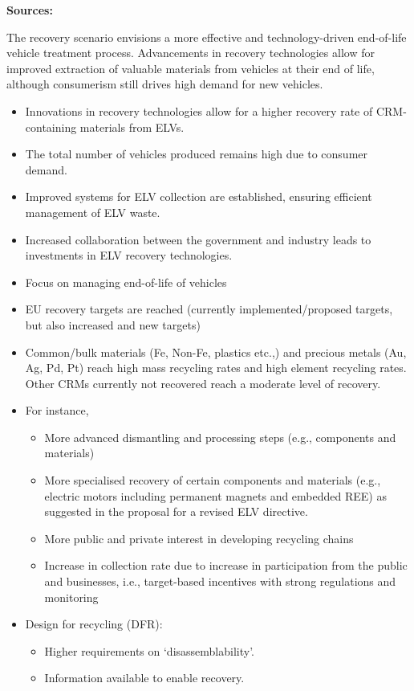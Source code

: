 \wasteSubsubsecELV 
\textbf{Sources:}~\cite{eu2023elv,lovik2021elv, tazi2023elv,helander2023battelv,ljunggren2022elv, iea2023evoutlook}

The recovery scenario envisions a more effective and technology-driven end-of-life vehicle treatment process. Advancements in recovery technologies allow for improved extraction of valuable materials from vehicles at their end of life, although consumerism still drives high demand for new vehicles.

\begin{itemize}
  \item Innovations in recovery technologies allow for a higher recovery rate of CRM-containing materials from ELVs.
  \item The total number of vehicles produced remains high due to consumer demand.
  \item Improved systems for ELV collection are established, ensuring efficient management of ELV waste.
  \item Increased collaboration between the government and industry leads to investments in ELV recovery technologies.
  \item Focus on managing end-of-life of vehicles
  \item EU recovery targets are reached (currently implemented/proposed targets, but also increased and new targets)
  \item Common/bulk materials (Fe, Non-Fe, plastics etc.,) and precious metals (Au, Ag, Pd, Pt) reach high mass recycling rates and high element recycling rates. Other CRMs currently not recovered reach a moderate level of recovery.
  \item For instance,
        \begin{itemize}
          \item More advanced dismantling and processing steps (e.g., components and materials)
          \item More specialised recovery of certain components and materials (e.g., electric motors including permanent magnets and embedded REE) as suggested in the proposal for a revised ELV directive.
          \item More public and private interest in developing recycling chains
          \item Increase in collection rate due to increase in participation from the public and businesses, i.e., target-based incentives with strong regulations and monitoring
        \end{itemize}
  \item Design for recycling (DFR):
        \begin{itemize}
          \item Higher requirements on `disassemblability'.
          \item Information available to enable recovery.
        \end{itemize}
\end{itemize}



